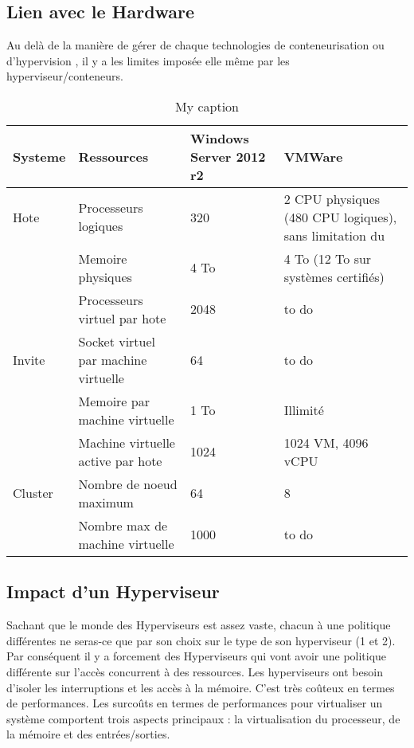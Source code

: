 \documentclass[french]{article}
\begin{document}
\subsection{Lien avec le Hardware}
Au delà de la manière de gérer de chaque technologies de conteneurisation ou d'hypervision , il y a les limites imposée elle même par les hyperviseur/conteneurs. 
\begin{table}[]
\centering
\caption{My caption}
\label{my-label}
\begin{tabular}{|l|l|l|l|}
\hline
Systeme & Ressources                           & Windows Server 2012 r2 & VMWare                                                 \\ \hline
Hote    & Processeurs logiques                 & 320                    & 2 CPU physiques (480 CPU logiques), sans limitation du \\ \hline
        & Memoire physiques                    & 4 To                   & 4 To (12 To sur systèmes certifiés)                    \\ \hline
        & Processeurs virtuel par hote         & 2048                   &                                                     to do    \\ \hline
Invite  & Socket virtuel par machine virtuelle & 64                     &                                                       to do   \\ \hline
        & Memoire par machine virtuelle        & 1 To                   & Illimité                                               \\ \hline
        & Machine virtuelle active par hote    & 1024                   & 1024 VM, 4096 vCPU                                     \\ \hline
Cluster & Nombre de noeud maximum              & 64                     & 8                                                      \\ \hline
        & Nombre max de machine virtuelle      & 1000                   &                                                       to do   \\ \hline
\end{tabular}
\end{table}

\subsection{Impact d'un Hyperviseur}
Sachant que le monde des Hyperviseurs est assez vaste, chacun à une politique différentes ne seras-ce que par son choix sur le type de son hyperviseur (1 et 2). Par conséquent il y a forcement des Hyperviseurs qui vont avoir une politique différente sur l'accès concurrent à des ressources. Les hyperviseurs ont besoin d'isoler les interruptions et les accès à la mémoire. C'est très coûteux en termes de performances. Les surcoûts en termes de performances pour virtualiser un système comportent trois aspects principaux : la virtualisation du processeur, de la mémoire et des entrées/sorties.
\end{document}
